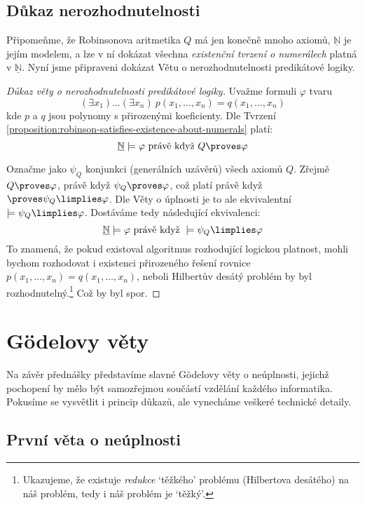 \subsection{Důkaz nerozhodnutelnosti}

Připomeňme, že Robinsonova aritmetika $Q$ má jen konečně mnoho axiomů, $\underline{\mathbb N}$ je jejím modelem, a lze v ní dokázat všechna \emph{existenční tvrzení o numerálech} platná v $\underline{\mathbb N}$. Nyní jsme připraveni dokázat Větu o nerozhodnutelnosti predikátové logiky.

\begin{proof}[Důkaz věty o nerozhodnutelnosti predikátové logiky]
Uvažme formuli $\varphi$ tvaru 
$$(\exists x_1)\dots(\exists x_n)\ p(x_1,\dots,x_n)=q(x_1,\dots,x_n)
$$ 
kde $p$ a $q$ jsou polynomy s přirozenými koeficienty. Dle Tvrzení \ref{proposition:robinson-satisfies-existence-about-numerals} platí:
$$
\underline{\mathbb N}\models \varphi\text{ právě když }Q\proves \varphi
$$

Označme jako $\psi_Q$ konjunkci (generálních uzávěrů) všech axiomů $Q$. Zřejmě $Q\proves\varphi$, právě když $\psi_Q\proves\varphi$, což platí právě když $\proves\psi_Q\limplies\varphi$. Dle Věty o úplnosti je to ale ekvivalentní $\models\psi_Q\limplies\varphi$. Dostáváme tedy následující ekvivalenci:
$$
\underline{\mathbb N}\models \varphi\text{ právě když }\models \psi_Q\limplies\varphi
$$
To znamená, že pokud existoval algoritmus rozhodující logickou platnost, mohli bychom rozhodovat i existenci přirozeného řešení rovnice $p(x_1,\dots,x_n)=q(x_1,\dots,x_n)$, neboli Hilbertův desátý problém by byl rozhodnutelný.\footnote{Ukazujeme, že existuje \emph{redukce} `těžkého' problému (Hilbertova desátého) na náš problém, tedy i náš problém je `těžký'.} Což by byl spor.   
\end{proof}

\section{Gödelovy věty}

Na závěr přednášky představíme slavné Gödelovy věty o neúplnosti, jejichž pochopení by mělo být samozřejmou součástí vzdělání každého informatika. Pokusíme se vysvětlit i princip důkazů, ale vynecháme veškeré technické detaily.

\subsection{První věta o neúplnosti}

